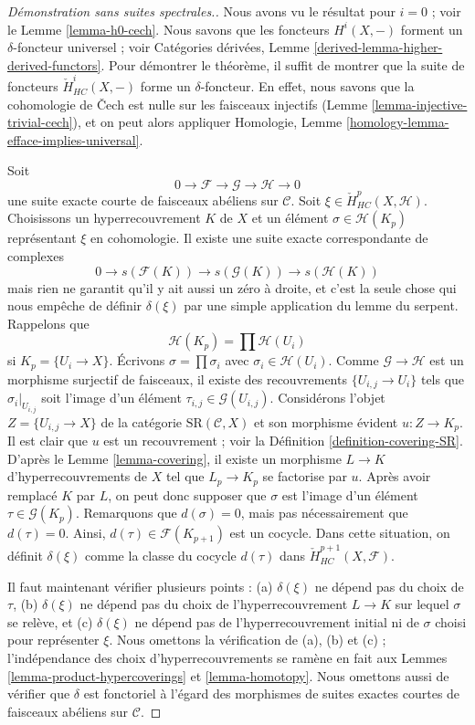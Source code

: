 \begin{proof}[Démonstration sans suites spectrales.]
Nous avons vu le résultat pour $i = 0$ ; voir le Lemme \ref{lemma-h0-cech}.
Nous savons que les foncteurs $H^i(X, -)$ forment un $\delta$-foncteur universel ; voir
Catégories dérivées, Lemme \ref{derived-lemma-higher-derived-functors}.
Pour démontrer le théorème, il suffit de montrer que
la suite de foncteurs $\check{H}^i_{HC}(X, -)$ forme un
$\delta$-foncteur. En effet, nous savons que la cohomologie de {\v C}ech
est nulle sur les faisceaux injectifs (Lemme \ref{lemma-injective-trivial-cech}),
et on peut alors appliquer
Homologie, Lemme \ref{homology-lemma-efface-implies-universal}.

\medskip\noindent
Soit
$$
0 \to \mathcal{F} \to \mathcal{G} \to \mathcal{H} \to 0
$$
une suite exacte courte de faisceaux abéliens sur $\mathcal{C}$.
Soit $\xi \in \check{H}^p_{HC}(X, \mathcal{H})$. Choisissons un hyperrecouvrement
$K$ de $X$ et un élément $\sigma \in \mathcal{H}(K_p)$ représentant
$\xi$ en cohomologie. Il existe une suite exacte correspondante de
complexes
$$
0 \to s(\mathcal{F}(K)) \to s(\mathcal{G}(K)) \to s(\mathcal{H}(K))
$$
mais rien ne garantit qu'il y ait aussi un zéro à droite, et c'est
la seule chose qui
nous empêche de définir $\delta(\xi)$ par une simple application du
lemme du serpent. Rappelons que
$$
\mathcal{H}(K_p) = \prod \mathcal{H}(U_i)
$$
si $K_p = \{U_i \to X\}$. Écrivons $\sigma =\prod \sigma_i$ avec
$\sigma_i \in \mathcal{H}(U_i)$. Comme $\mathcal{G} \to \mathcal{H}$ est
un morphisme surjectif de faisceaux, il existe des recouvrements
$\{U_{i, j} \to U_i\}$ tels que $\sigma_i|_{U_{i, j}}$ soit
l'image d'un élément $\tau_{i, j} \in \mathcal{G}(U_{i, j})$.
Considérons l'objet $Z = \{U_{i, j} \to X\}$ de la catégorie
$\text{SR}(\mathcal{C}, X)$ et son morphisme évident
$u : Z \to K_p$. Il est clair que $u$ est un recouvrement ; voir
la Définition \ref{definition-covering-SR}. D'après le
Lemme \ref{lemma-covering}, il
existe un morphisme $L \to K$ d'hyperrecouvrements de $X$ tel que
$L_p \to K_p$ se factorise par $u$. Après avoir remplacé $K$ par $L$,
on peut donc supposer que $\sigma$ est l'image d'un
élément $\tau \in \mathcal{G}(K_p)$. Remarquons que $d(\sigma) = 0$,
mais pas nécessairement que $d(\tau) = 0$. Ainsi, $d(\tau) \in \mathcal{F}(K_{p + 1})$
est un cocycle. Dans cette situation, on définit
$\delta(\xi)$ comme la classe du cocycle $d(\tau)$ dans
$\check{H}^{p + 1}_{HC}(X, \mathcal{F})$.

\medskip\noindent
Il faut maintenant vérifier plusieurs points :
(a) $\delta(\xi)$ ne dépend pas du choix de $\tau$,
(b) $\delta(\xi)$ ne dépend pas du choix de l'hyperrecouvrement
$L \to K$ sur lequel $\sigma$ se relève, et
(c) $\delta(\xi)$ ne dépend pas de l'hyperrecouvrement initial ni de
$\sigma$ choisi pour représenter $\xi$. Nous omettons la vérification de
(a), (b) et (c) ; l'indépendance des choix d'hyperrecouvrements
se ramène en fait aux Lemmes \ref{lemma-product-hypercoverings}
et \ref{lemma-homotopy}. Nous omettons aussi de vérifier que
$\delta$ est fonctoriel à l'égard des morphismes de suites exactes
courtes de faisceaux abéliens sur $\mathcal{C}$.


\end{proof}
